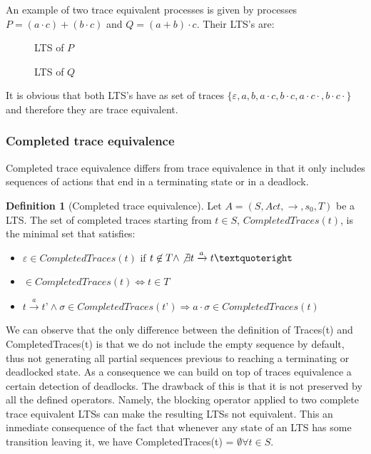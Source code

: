 \documentclass[11pt]{article}
\theoremstyle{definition}
\newtheorem{definition}{Definition}
\newcommand{\cmark}{\ding{51}}
\theoremstyle{plain}
\theoremstyle{definition}
\renewcommand{\epsilon}{\varepsilon}
\begin{document}
An example of two trace equivalent processes is given by processes $ P = (a·c) + (b·c) $ and $ Q = (a + b)·c $. Their LTS's are:

\begin{figure} [H]
	\centering
	
	\caption{LTS of $P$} \label{fig:TraceEquivalenceP}
	\endminipage\hfill
	\centering
	
	\caption{LTS of $Q$} \label{fig:TraceEquivalenceQ}
	\endminipage\hfill
\end{figure}

It is obvious that both LTS's have as set of traces $ \{ \epsilon,a,b,a·c,b·c,a·c·$\cmark$,b·c·$\cmark$\} $ and therefore they are trace equivalent.

\subsubsection{Completed trace equivalence} 
Completed trace equivalence differs from trace equivalence in that it only includes sequences of actions that end in a terminating state or in a deadlock.
\begin{definition} [Completed trace equivalence]
	Let $ A = (S, Act, \rightarrow, s_0, T) $ be a LTS. The set of completed traces starting from $ t \in S $, $ CompletedTraces(t) $, is the minimal set that satisfies:
	\begin{itemize}
		\item $ \varepsilon \in CompletedTraces(t) $ if $ t \not \in T \wedge \not \exists t\xrightarrow{a}t’$
		\item \cmark $\in CompletedTraces(t) \iff t \in T$
		\item $ t\xrightarrow{a}t’ \wedge \sigma \in CompletedTraces(t’) \Rightarrow a\cdot\sigma \in CompletedTraces(t)$
	\end{itemize}
\end{definition}
We can observe that the only difference between the definition of Traces(t) and CompletedTraces(t) is that we do not include the empty sequence by default, thus not generating all partial sequences previous to reaching a terminating or deadlocked state.
As a consequence we can build on top of traces equivalence a certain detection of deadlocks. The drawback of this is that it is not preserved by all the defined operators. Namely, the blocking operator applied to two complete trace equivalent LTSs can make the resulting LTSs not equivalent. This an inmediate consequence of the fact that whenever any state of an LTS has some transition leaving it, we have CompletedTraces(t) = $ \emptyset \forall t \in S$.
\end{document}
